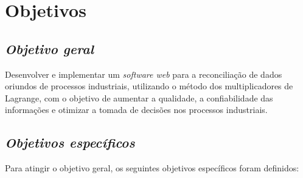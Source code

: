 \section{Objetivos}

\subsection{\textit{Objetivo geral}}

Desenvolver e implementar um \textit{software web} para a reconciliação de dados oriundos de processos industriais, utilizando o método dos multiplicadores de Lagrange, com o objetivo de aumentar a qualidade, a confiabilidade das informações e otimizar a tomada de decisões nos processos industriais.

\subsection{\textit{Objetivos específicos}}

Para atingir o objetivo geral, os seguintes objetivos específicos foram definidos:


